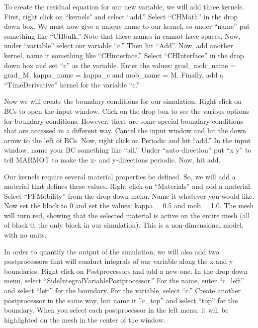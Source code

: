 \documentclass[letter,12pt,fleqn]{article}
\begin{document}
To create the residual equation for our new variable, we will add three kernels. First, right click on ``kernels" and select ``add.'' Select ``CHMath'' in the drop down box. We must now give a unique name to our kernel, so under ``name'' put something like ``CHbulk.'' Note that these names in cannot have spaces. Now, under ``variable'' select our variable ``c.'' Then hit ``Add''. Now, add another kernel, name it something like ``CHinterface.''  Select ``CHInterface'' in the drop down box and set ``c'' as the variable. Enter the values: grad\_mob\_name = grad\_M, kappa\_name = kappa\_c and mob\_name = M. Finally, add a ``TimeDerivative'' kernel for the variable ``c.''

Now we will create the boundary conditions for our simulation. Right click on BCs to open the input window. Click on the drop box to see the various options for boundary conditions. However, there are some special boundary conditions that are accessed in a different way. Cancel the input window and hit the down arrow to the left of BCs. Now, right click on Periodic and hit ``add.'' In the input window, name your BC something like ``all.'' Under ``auto-direction'' put ``x y'' to tell MARMOT to make the x- and y-directions periodic. Now, hit add.

Our kernels require several material properties be defined. So, we will add a material that defines these values. Right click on ``Materials'' and add a material. Select ``PFMobility'' from the drop down menu. Name it whatever you would like. Now set the block to 0 and set the values: kappa = 0.5 and mob = 1.0. The mesh will turn red, showing that the selected material is active on the entire mesh (all of block 0, the only block in our simulation). This is a non-dimensional model, with no units.

In order to quantify the output of the simulation, we will also add two postprocessors that will conduct integrals of our variable along the x and y boundaries. Right click on Postprocessors and add a new one. In the drop down menu, select ``SideIntegralVariablePostprocessor.'' For the name, enter ``c\_left'' and select ``left'' for the boundary. For the variable, select ``c.'' Create another postprocessor in the same way, but name it ''c\_top'' and select ``top'' for the boundary. When you select each postprocessor in the left menu, it will be highlighted on the mesh in the center of the window.
\end{document}
